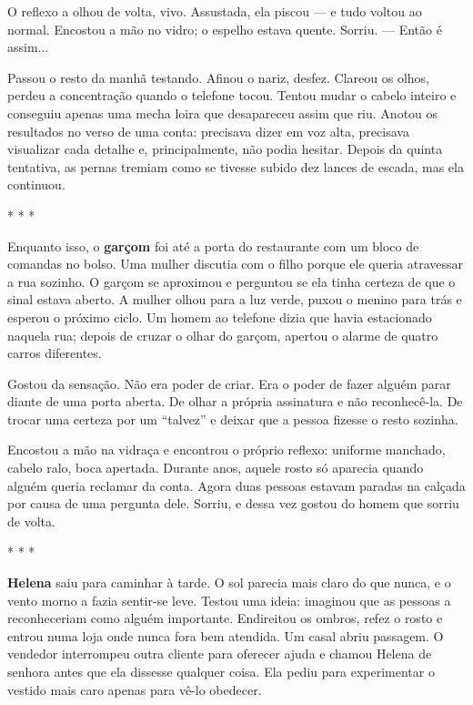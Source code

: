 O reflexo a olhou de volta, vivo.  
Assustada, ela piscou — e tudo voltou ao normal.  
Encostou a mão no vidro; o espelho estava quente.  
Sorriu.  
— Então é assim...

Passou o resto da manhã testando. Afinou o nariz, desfez. Clareou os olhos, perdeu a concentração quando o telefone tocou. Tentou mudar o cabelo inteiro e conseguiu apenas uma mecha loira que desapareceu assim que riu. Anotou os resultados no verso de uma conta: precisava dizer em voz alta, precisava visualizar cada detalhe e, principalmente, não podia hesitar. Depois da quinta tentativa, as pernas tremiam como se tivesse subido dez lances de escada, mas ela continuou.

\begin{center}
* * *
\end{center}

Enquanto isso, o \textbf{garçom} foi até a porta do restaurante com um bloco de comandas no bolso. Uma mulher discutia com o filho porque ele queria atravessar a rua sozinho. O garçom se aproximou e perguntou se ela tinha certeza de que o sinal estava aberto. A mulher olhou para a luz verde, puxou o menino para trás e esperou o próximo ciclo. Um homem ao telefone dizia que havia estacionado naquela rua; depois de cruzar o olhar do garçom, apertou o alarme de quatro carros diferentes.

Gostou da sensação.  
Não era poder de criar.  
Era o poder de fazer alguém parar diante de uma porta aberta. De olhar a própria assinatura e não reconhecê-la. De trocar uma certeza por um “talvez” e deixar que a pessoa fizesse o resto sozinha.

Encostou a mão na vidraça e encontrou o próprio reflexo: uniforme manchado, cabelo ralo, boca apertada. Durante anos, aquele rosto só aparecia quando alguém queria reclamar da conta. Agora duas pessoas estavam paradas na calçada por causa de uma pergunta dele. Sorriu, e dessa vez gostou do homem que sorriu de volta.

\begin{center}
* * *
\end{center}

\textbf{Helena} saiu para caminhar à tarde.  
O sol parecia mais claro do que nunca, e o vento morno a fazia sentir-se leve.  
Testou uma ideia: imaginou que as pessoas a reconheceriam como alguém importante. Endireitou os ombros, refez o rosto e entrou numa loja onde nunca fora bem atendida. Um casal abriu passagem. O vendedor interrompeu outra cliente para oferecer ajuda e chamou Helena de senhora antes que ela dissesse qualquer coisa. Ela pediu para experimentar o vestido mais caro apenas para vê-lo obedecer.

